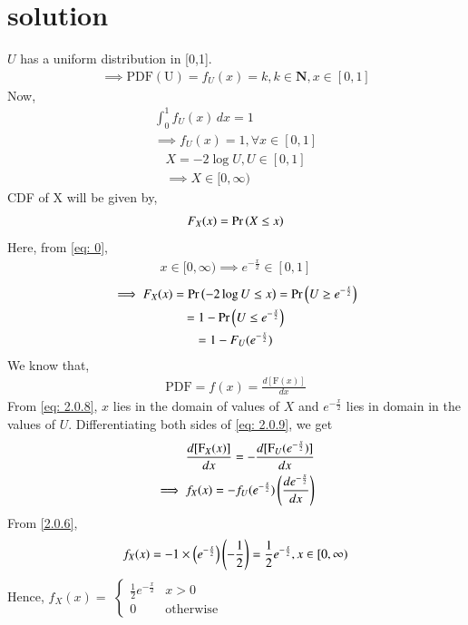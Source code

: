 \documentclass[journal,12pt,twocolumn]{IEEEtran}
\begin{document}
\section{solution}
$U$ has a uniform distribution in [0,1].
\begin{align}
    \implies \mathrm{PDF(U)}=f_U(x)=k, k\in\textbf{N}, x\in[0,1]
\end{align}
Now,
\begin{align}
    \int_{0}^1 f_U(x)\,dx=1\\
    \implies f_U(x)=1, \forall x\in[0,1]\label{2.0.6}
\end{align}
\begin{align}
    X=-2\log{U},U\in[0,1]\\
    \implies X\in[0,\infty)\label{eq: 0}
\end{align}
CDF of X will be given by,
\begin{align}
F_{X}(x) = \Pr\left(X\leq x\right)  
\end{align}
Here, from \eqref{eq: 0},
\begin{align}
x\in[0,\infty)
    \implies e^{-\frac{x}{2}}\in [0,1]\label{eq: 2.0.8}
\end{align}
\begin{multline}
    \implies F_X(x)  =\Pr\left(-2\log U\leq x\right) 
    =\Pr\left(U\geq e^{-\frac{x}{2}}\right)\\
    =1-\Pr\left(U\leq e^{-\frac{x}{2}}\right)\\
    =1-F_{U}(e^{-\frac{x}{2}})\label{eq: 2.0.9}
    \end{multline}
We know that,
\begin{align}
    \mathrm{PDF}=f(x)=\frac{d[\mathrm{F}(x)]}{dx}
\end{align}
From \eqref{eq: 2.0.8}, $x$ lies in the domain of values of $X$ and $e^{-\frac{x}{2}}$ lies in domain in the values of $U$. Differentiating both sides of \eqref{eq: 2.0.9}, we get
\begin{align}
    \frac{d[\mathrm{F}_X(x)]}{dx}=-\frac{d[\mathrm{F}_U(e^{-\frac{x}{2}})]}{dx}\label{eq: 2.0.3}\\
    \implies f_{X}(x)=-f_{U}(e^{-\frac{x}{2}})\left(\frac{de^{-\frac{x}{2}}}{dx}\right)
    \end{align}
  From \eqref{2.0.6},
  \begin{align}
      f_X(x)=-1\times \left(e^{-\frac{x}{2}}\right)\left(-\frac{1}{2}\right)=\frac{1}{2}e^{-\frac{x}{2}},x\in[0,\infty)
  \end{align}
  Hence,
  $f_X(x)=$
$\begin{cases}
\frac{1}{2}e^{-\frac{x}{2}} & x>0\\
0 & \mathrm{otherwise}
\end{cases}$
\end{document}
